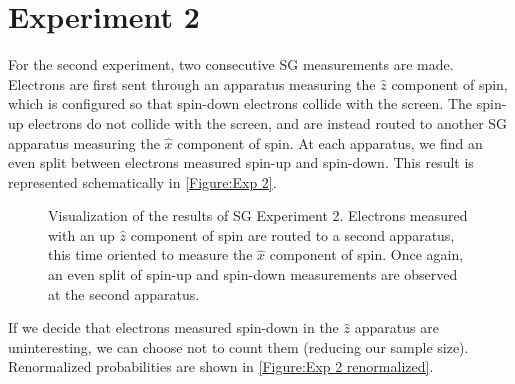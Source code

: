 \section{Experiment 2}

For the second experiment, two consecutive SG measurements are made. Electrons are first sent through an apparatus measuring the $\hat{z}$ component of spin, which is configured so that spin-down electrons collide with the screen. The spin-up electrons do not collide with the screen, and are instead routed to another SG apparatus measuring the $\hat{x}$ component of spin. At each apparatus, we find an even split between electrons measured spin-up and spin-down. This result is represented schematically in \autoref{Figure:Exp 2}.

\begin{figure}[!t]
\centering\CaptionFontSize
{}

\caption[Insert an abbreviated caption here to show in the List of Figures]
{Visualization of the results of SG Experiment 2. Electrons measured with an up $\hat{z}$ component of spin are routed to a second apparatus, this time oriented to measure the $\hat{x}$ component of spin. Once again, an even split of spin-up and spin-down measurements are observed at the second apparatus.}
\label{Figure:Exp 2}
\end{figure}

If we decide that electrons measured spin-down in the $\hat{z}$ apparatus are uninteresting, we can choose not to count them (reducing our sample size). Renormalized probabilities are shown in \autoref{Figure:Exp 2 renormalized}.

